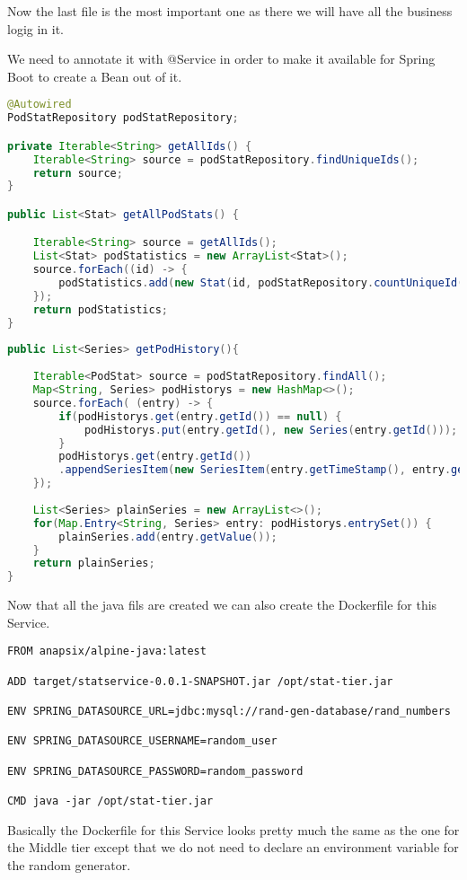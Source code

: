 Now the last file is the most important one as there we will have all the business logig in it.

We need to annotate it with @Service in order to make it available for Spring Boot to create a Bean out of it.


\begin{lstlisting}[language=Java]
@Autowired
PodStatRepository podStatRepository;

private Iterable<String> getAllIds() {
	Iterable<String> source = podStatRepository.findUniqueIds();
	return source;
}

public List<Stat> getAllPodStats() {

	Iterable<String> source = getAllIds();
	List<Stat> podStatistics = new ArrayList<Stat>();
	source.forEach((id) -> {
		podStatistics.add(new Stat(id, podStatRepository.countUniqueId(id)));
	});
	return podStatistics;
}
	
public List<Series> getPodHistory(){
		
	Iterable<PodStat> source = podStatRepository.findAll();	
	Map<String, Series> podHistorys = new HashMap<>();	
	source.forEach( (entry) -> {				
		if(podHistorys.get(entry.getId()) == null) {			
			podHistorys.put(entry.getId(), new Series(entry.getId()));			
		}
		podHistorys.get(entry.getId())
		.appendSeriesItem(new SeriesItem(entry.getTimeStamp(), entry.getCounter()));							
	});
		
	List<Series> plainSeries = new ArrayList<>();	
	for(Map.Entry<String, Series> entry: podHistorys.entrySet()) {			
	    plainSeries.add(entry.getValue());	
	}
	return plainSeries;	
}
\end{lstlisting}

Now that all the java fils are created we can also create the Dockerfile for this Service.

\begin{lstlisting}
FROM anapsix/alpine-java:latest

ADD target/statservice-0.0.1-SNAPSHOT.jar /opt/stat-tier.jar

ENV SPRING_DATASOURCE_URL=jdbc:mysql://rand-gen-database/rand_numbers

ENV SPRING_DATASOURCE_USERNAME=random_user

ENV SPRING_DATASOURCE_PASSWORD=random_password

CMD java -jar /opt/stat-tier.jar

\end{lstlisting}

Basically the Dockerfile for this Service looks pretty much the same as the one for the Middle tier except that we do not need to declare an environment variable for the random generator.
